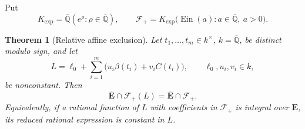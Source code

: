 \documentclass[11pt,a4paper]{article}
\newtheorem{theorem}{Theorem}[section]
\theoremstyle{definition}\newtheorem{definition}[theorem]{Definition}
\theoremstyle{remark}\newtheorem{remark}[theorem]{Remark}
\begin{document}
Put
\[
 K_{\exp}=\overline{\mathbb Q}(e^\rho:\rho\in\overline{\mathbb Q}),
 \qquad
 \mathcal F_+=K_{\exp}
       \bigl(\operatorname{Ein}(a):a\in\overline{\mathbb Q},\ a>0\bigr).
\]

\begin{theorem}[Relative affine exclusion]\label{ext:ape:main}
Let $t_1,\ldots,t_m\in k^\times$, $k=\overline{\mathbb Q}$, be distinct
modulo sign, and let
\[
 L=\ell_0+\sum_{i=1}^m
              \bigl(u_i\beta(t_i)+v_iC(t_i)\bigr),
 \qquad \ell_0,u_i,v_i\in k,
\]
be nonconstant.  Then
\[
 \boxed{\quad
 \overline{\mathbf E}\cap\mathcal F_+(L)
                     =\overline{\mathbf E}\cap\mathcal F_+.
 \quad}
\]
Equivalently, if a rational function of $L$ with coefficients in
$\mathcal F_+$ is integral over $\mathbf E$, its reduced rational
expression is constant in $L$.
\end{theorem}
\end{document}
